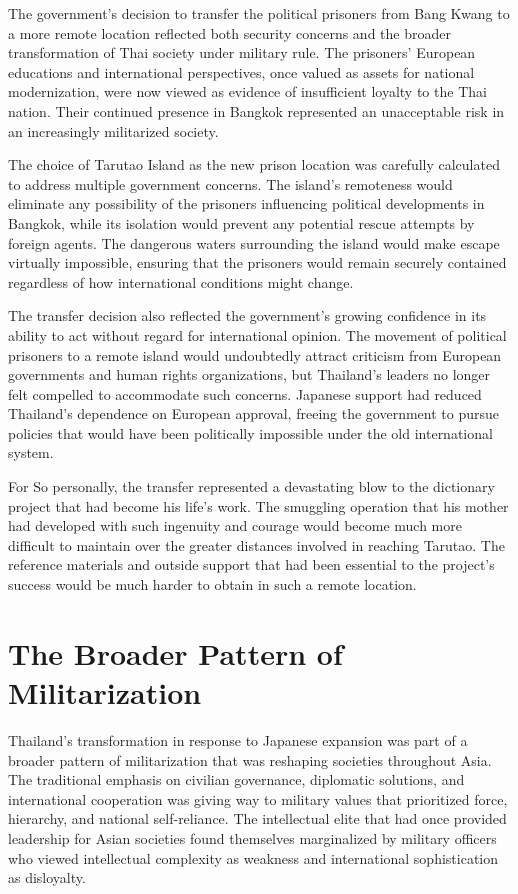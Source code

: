 \documentclass[
  Letterpaper,
]{scrbook}
\begin{document}
The government's decision to transfer the political prisoners from Bang
Kwang to a more remote location reflected both security concerns and the
broader transformation of Thai society under military rule. The
prisoners' European educations and international perspectives, once
valued as assets for national modernization, were now viewed as evidence
of insufficient loyalty to the Thai nation. Their continued presence in
Bangkok represented an unacceptable risk in an increasingly militarized
society.

The choice of Tarutao Island as the new prison location was carefully
calculated to address multiple government concerns. The island's
remoteness would eliminate any possibility of the prisoners influencing
political developments in Bangkok, while its isolation would prevent any
potential rescue attempts by foreign agents. The dangerous waters
surrounding the island would make escape virtually impossible, ensuring
that the prisoners would remain securely contained regardless of how
international conditions might change.

The transfer decision also reflected the government's growing confidence
in its ability to act without regard for international opinion. The
movement of political prisoners to a remote island would undoubtedly
attract criticism from European governments and human rights
organizations, but Thailand's leaders no longer felt compelled to
accommodate such concerns. Japanese support had reduced Thailand's
dependence on European approval, freeing the government to pursue
policies that would have been politically impossible under the old
international system.

For So personally, the transfer represented a devastating blow to the
dictionary project that had become his life's work. The smuggling
operation that his mother had developed with such ingenuity and courage
would become much more difficult to maintain over the greater distances
involved in reaching Tarutao. The reference materials and outside
support that had been essential to the project's success would be much
harder to obtain in such a remote location.

\section{The Broader Pattern of
Militarization}\label{the-broader-pattern-of-militarization}

Thailand's transformation in response to Japanese expansion was part of
a broader pattern of militarization that was reshaping societies
throughout Asia. The traditional emphasis on civilian governance,
diplomatic solutions, and international cooperation was giving way to
military values that prioritized force, hierarchy, and national
self-reliance. The intellectual elite that had once provided leadership
for Asian societies found themselves marginalized by military officers
who viewed intellectual complexity as weakness and international
sophistication as disloyalty.
\end{document}

